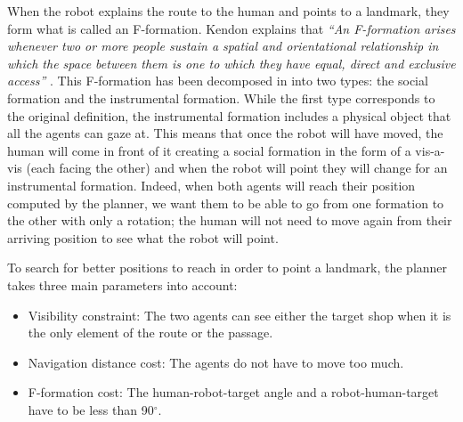 When the robot explains the route to the human and points to a landmark, they form what is called an F-formation. Kendon explains that \textit{``An F-formation arises whenever two or more people sustain a spatial and orientational relationship in which the space between them is one to which they have equal, direct and exclusive access''} \cite{kendon_1990_conducting}.
This F-formation has been decomposed in \cite{mcneill_2005_gesture} into two types: the social formation and the instrumental formation. While the first type corresponds to the original definition, the instrumental formation includes a physical object that all the agents can gaze at. This means that once the robot will have moved, the human will come in front of it creating a social formation in the form of a vis-a-vis (each facing the other) and when the robot will point they will change for an instrumental formation. Indeed, when both agents will reach their position computed by the planner, we want them to be able to go from one formation to the other with only a rotation; the human will not need to move again from their arriving position to see what the robot will point. 

To search for better positions to reach in order to point a landmark, the planner takes three main parameters into account:

\begin{itemize}
    \item Visibility constraint: The two agents can see either the target shop when it is the only element of the route or the passage.
    \item Navigation distance cost: The agents do not have to move too much.
    \item F-formation cost: The human-robot-target angle and a robot-human-target have to be less than 90${^\circ}$. 
\end{itemize}


